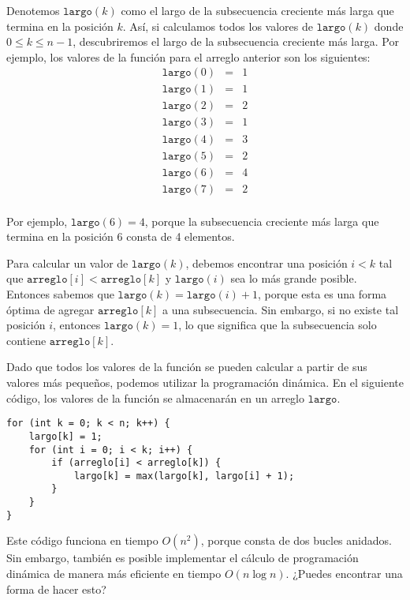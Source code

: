 Denotemos $\texttt{largo}(k)$ como
el largo de la
subsecuencia creciente más larga
que termina en la posición $k$.
Así, si calculamos todos los valores de
$\texttt{largo}(k)$ donde $0 \le k \le n-1$,
descubriremos el largo de la
subsecuencia creciente más larga.
Por ejemplo, los valores de la función
para el arreglo anterior son los siguientes:
\[
    \begin{array}{lcl}
        \texttt{largo}(0) & = & 1 \\
        \texttt{largo}(1) & = & 1 \\
        \texttt{largo}(2) & = & 2 \\
        \texttt{largo}(3) & = & 1 \\
        \texttt{largo}(4) & = & 3 \\
        \texttt{largo}(5) & = & 2 \\
        \texttt{largo}(6) & = & 4 \\
        \texttt{largo}(7) & = & 2 \\
    \end{array}
\]

Por ejemplo, $\texttt{largo}(6)=4$,
porque la subsecuencia creciente más larga
que termina en la posición 6 consta de 4 elementos.

Para calcular un valor de $\texttt{largo}(k)$,
debemos encontrar una posición $i<k$
tal que $\texttt{arreglo}[i]<\texttt{arreglo}[k]$
y $\texttt{largo}(i)$ sea lo más grande posible.
Entonces sabemos que
$\texttt{largo}(k)=\texttt{largo}(i)+1$,
porque esta es una forma óptima de agregar
$\texttt{arreglo}[k]$ a una subsecuencia.
Sin embargo, si no existe tal posición $i$,
entonces $\texttt{largo}(k)=1$,
lo que significa que la subsecuencia solo contiene
$\texttt{arreglo}[k]$.

Dado que todos los valores de la función se pueden calcular
a partir de sus valores más pequeños,
podemos utilizar la programación dinámica.
En el siguiente código, los valores
de la función se almacenarán en un arreglo
$\texttt{largo}$.

\begin{lstlisting}
for (int k = 0; k < n; k++) {
    largo[k] = 1;
    for (int i = 0; i < k; i++) {
        if (arreglo[i] < arreglo[k]) {
            largo[k] = max(largo[k], largo[i] + 1);
        }
    }
}
\end{lstlisting}

Este código funciona en tiempo $O(n^2)$,
porque consta de dos bucles anidados.
Sin embargo, también es posible implementar
el cálculo de programación dinámica
de manera más eficiente en tiempo $O(n \log n)$.
¿Puedes encontrar una forma de hacer esto?

